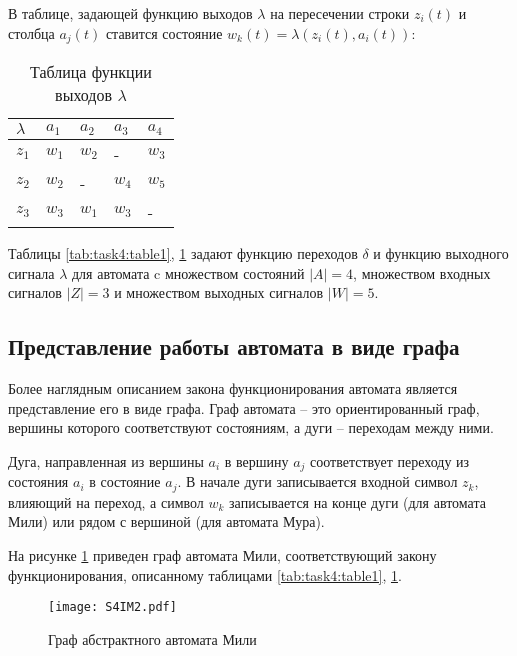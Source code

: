 В таблице, задающей функцию выходов $\lambda$ на пересечении строки $z_i(t)$ и столбца $a_j(t)$
ставится состояние $w_k(t) = \lambda(z_i(t), a_i(t))$:

\begin{table}[h!]
    \caption{Таблица функции выходов $\lambda$}
    \begin{tabular}{| >{\centering}m{} 
                    | >{\centering}m{} 
                    | >{\centering}m{} 
                    | >{\centering}m{} 
                    | >{\centering\arraybackslash}m{}|} 
        \hline $\lambda$  &  $a_1$  &  $a_2$  &  $a_3$  &  $a_4$ \\
        \hline  $z_1$     &  $w_1$  &  $w_2$  &    -    &  $w_3$ \\
        \hline  $z_2$     &  $w_2$  &    -    &  $w_4$  &  $w_5$ \\        
        \hline  $z_3$     &  $w_3$  &  $w_1$  &  $w_3$  &    -   \\
        \hline
    \end{tabular}
    \label{tab:task4:table2}
\end{table}

Таблицы \ref{tab:task4:table1}, \ref{tab:task4:table2} задают 
функцию переходов $\delta$ и функцию выходного сигнала $\lambda$ для автомата c множеством состояний $|A| = 4$, 
множеством входных сигналов $|Z| = 3$
и множеством выходных сигналов $|W| = 5$.

\subsection{Представление работы автомата в виде графа}

Более наглядным описанием закона функционирования автомата является представление его в виде графа.
Граф автомата -- это ориентированный граф, вершины которого соответствуют состояниям, а дуги -- переходам между ними.

Дуга, направленная из вершины $a_i$ в вершину $a_j$ соответствует переходу из состояния $a_i$ в состояние $a_j$.
В начале дуги записывается входной символ $z_k$, влияющий на переход, а символ $w_k$ записывается на конце дуги (для автомата Мили)
или рядом с вершиной (для автомата Мура). 

На рисунке \ref{fig:task4:graph} приведен граф автомата Мили, соответствующий закону функционирования, 
описанному таблицами \ref{tab:task4:table1}, \ref{tab:task4:table2}.

\begin{figure}[h!]
    \centering
    \texttt{[image: S4IM2.pdf]}
    \caption{Граф абстрактного автомата Мили}
    \label{fig:task4:graph}
\end{figure}